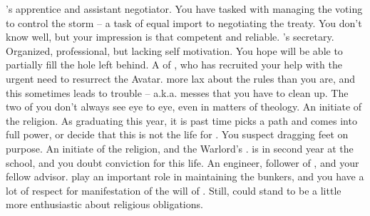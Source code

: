 \documentclass[char]{GL2020}
\begin{document}
\begin{contacts}
	\contact{\cJuniorStatesman{}} \cHeadDiplomat{}'s apprentice and assistant negotiator. You have tasked \cJuniorStatesman{} with managing the voting to control the storm -- a task of equal import to negotiating the treaty. You don't know \cJuniorStatesman{\them} well, but your impression is that \cJuniorStatesman{\theyare} competent and reliable.
	\contact{\cChupLeader{}} \cHeadDiplomat{}'s secretary. Organized, professional, but lacking self motivation. You hope \cChupLeader{\they} will be able to partially fill the hole \cHeadDiplomat{} left behind.
	\contact{\cFlowPriest{}} A \cFlowPriest{\cleric} of \cFlow{}, who has recruited your help with the urgent need to resurrect the \cEbb{} Avatar. \cFlowPriest{\Theyare} more lax about the rules than you are, and this sometimes leads to trouble – a.k.a. messes that you have to clean up. The two of you don't always see eye to eye, even in matters of theology.
	\contact{\cInitiate{}} An initiate of the \pShippie{} religion. As \cInitiate{\they} \cInitiate{\are} graduating this year, it is past time \cInitiate{} picks a path and comes into \cInitiate{\their} full power, or decide that this is not the life for \cInitiate{\them}. You suspect \cInitiate{\theyare} dragging \cInitiate{\their} feet on purpose.
	\contact{\cWarlordDaughter{}} An initiate of the \pShippie{} religion, and the Warlord's \cWarlordDaughter{\child}. \cWarlordDaughter{} is in \cWarlordDaughter{\their} second year at the school, and you doubt \cWarlordDaughter{\their} conviction for this life.
	\contact{\cBunker{}} An engineer, follower of \cFlow{}, and your fellow advisor. \cBunker{\They} play\cBunker{\plural} an important role in maintaining the bunkers, and you have a lot of respect for \cBunker{\their} manifestation of the will of \cFlow{}. Still, \cBunker{\they} could stand to be a little more enthusiastic about \cBunker{\their} religious obligations.
\end{contacts}
\end{document}
